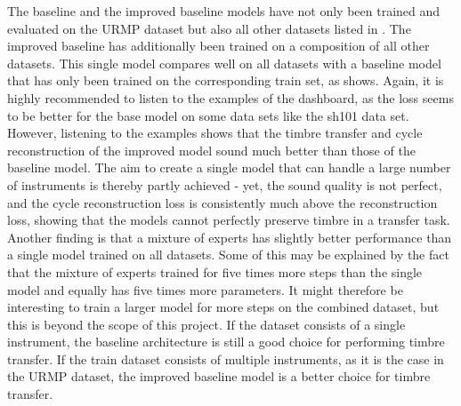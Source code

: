 The baseline and the improved baseline models have not only been trained and evaluated on the URMP dataset but also all other datasets listed in . The improved baseline has additionally been trained on a composition of all other datasets.
This single model compares well on all datasets with a baseline model that has only been trained on the corresponding train set, as  shows. Again, it is highly recommended to listen to the examples of the dashboard, as the loss seems to be better for the base model on some data sets like the sh101 data set. However, listening to the examples shows that the timbre transfer and cycle reconstruction of the improved model sound much better than those of the baseline model.
The aim to create a single model that can handle a large number of instruments is thereby partly achieved - yet, the sound quality is not perfect, and the cycle reconstruction loss is consistently much above the reconstruction loss, showing that the models cannot perfectly preserve timbre in a transfer task.
Another finding is that a mixture of experts has slightly better performance than a single model trained on all datasets.
Some of this may be explained by the fact that the mixture of experts trained for five times more steps than the single model and equally has five times more parameters. It might therefore be interesting to train a larger model for more steps on the combined dataset, but this is beyond the scope of this project. \newline
If the dataset consists of a single instrument, the baseline architecture is still a good choice for performing timbre transfer. If the train dataset consists of multiple instruments, as it is the case in the URMP dataset, the improved baseline model is a better choice for timbre transfer.

